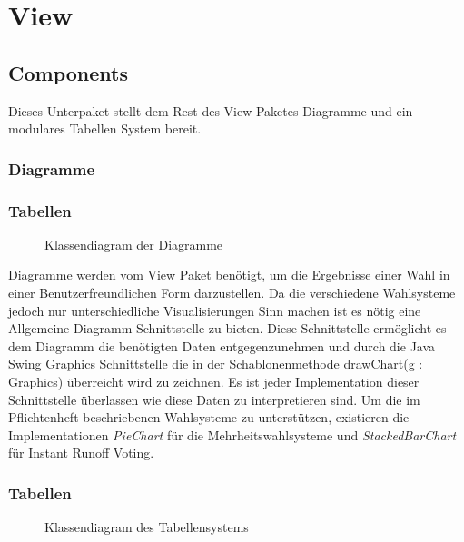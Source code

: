 \documentclass[parskip=full]{scrartcl}
\begin{document}
	\section{View}
	\pagestyle{headings}	
		\subsection{Components}
		Dieses Unterpaket stellt dem Rest des View Paketes Diagramme und ein modulares Tabellen System bereit.
		
		\subsubsection{Diagramme}
		\subsubsection{Tabellen}
		\begin{figure}[!h]
			\centering
			
			\caption{Klassendiagram der Diagramme}
		\end{figure}
		
		Diagramme werden vom View Paket benötigt, um die Ergebnisse einer Wahl in einer Benutzerfreundlichen Form darzustellen. Da die verschiedene Wahlsysteme jedoch nur unterschiedliche Visualisierungen Sinn machen ist es nötig eine Allgemeine Diagramm Schnittstelle zu bieten. Diese Schnittstelle ermöglicht es dem Diagramm die benötigten Daten entgegenzunehmen und durch die Java Swing Graphics Schnittstelle die in der Schablonenmethode drawChart(g : Graphics) überreicht wird zu zeichnen. Es ist jeder Implementation dieser Schnittstelle überlassen wie diese Daten zu interpretieren sind. Um die im Pflichtenheft beschriebenen Wahlsysteme zu unterstützen, existieren die Implementationen \textit{PieChart} für die Mehrheitswahlsysteme und \textit{StackedBarChart} für Instant Runoff Voting.
		
		\subsubsection{Tabellen}
		\begin{figure}[!h]
		\centering
		
		\caption{Klassendiagram des Tabellensystems}
		\end{figure}
		
\end{document}
